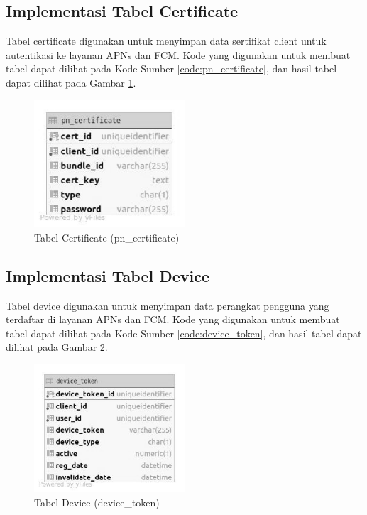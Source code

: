 \subsection{Implementasi Tabel Certificate}
\par Tabel certificate digunakan untuk menyimpan data sertifikat client untuk autentikasi ke layanan APNs dan FCM. Kode yang digunakan untuk membuat tabel dapat dilihat pada Kode Sumber \ref{code:pn_certificate}, dan hasil tabel dapat dilihat pada Gambar \ref{tabel_pn_certificate}.

\begin{figure}[H]
    \centering\includegraphics[width=0.5\textwidth]{bab4/figures/tabel_pn_certificate.jpg}
    \caption{Tabel Certificate (pn\_certificate)}
    \label{tabel_pn_certificate}
\end{figure}

\subsection{Implementasi Tabel Device}
\par Tabel device digunakan untuk menyimpan data perangkat pengguna yang terdaftar di layanan APNs dan FCM. Kode yang digunakan untuk membuat tabel dapat dilihat pada Kode Sumber \ref{code:device_token}, dan hasil tabel dapat dilihat pada Gambar \ref{tabel_device_token}.

\begin{figure}[H]
    \centering\includegraphics[width=0.5\textwidth]{bab4/figures/tabel_device_token.jpg}
    \caption{Tabel Device (device\_token)}
    \label{tabel_device_token}
\end{figure}

